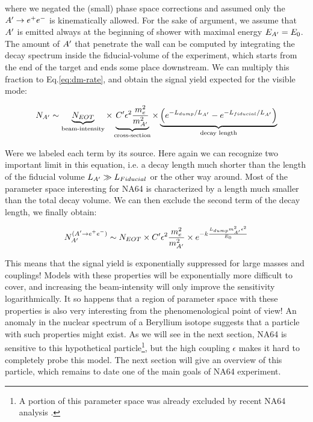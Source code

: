 where we negated the (small) phase space corrections and assumed only the $A' \to e^+e^-$ is kinematically allowed. For the sake of argument, we assume that $A'$ is emitted always at the beginning of shower with maximal energy $E_{A'} = E_0$. The amount of $A'$ that penetrate the wall can be computed by integrating the decay spectrum inside the fiducial-volume of the experiment, which starts from the end of the target and ends some place downstream. We can multiply this fraction to Eq.\ref{eq:dm-rate}, and obtain the signal yield expected for the visible mode:

\begin{equation}
  \label{eq:dm-rate-vis}
    N_{A'} \sim \underbrace{N_{EOT}}_{\textrm{beam-intensity}} \times \underbrace{C' \epsilon^2 \frac{m_e^2}{m^2_{A'}}}_{\textrm{cross-section}} \times \underbrace{\left(e^{- L_{dump}/L_{A'}} - e^{-L_{fiducial}/L_{A'}}\right)}_{\textrm{decay length}}
  \end{equation}

  Were we labeled each term by its source. Here again we can recognize two important limit in this equation, i.e. a decay length much shorter than the length of the fiducial volume $L_{A'} \gg L_{Fiducial}$ or the other way around. Most of the parameter space interesting for NA64 is characterized by a length much smaller than the total decay volume. We can then exclude the second term of the decay length, we finally obtain:

  \begin{equation}
    \label{eq:dm-rate-vis-limit}
    N_{A'}^{(A' \to e^+e^-)} \sim N_{EOT} \times C' \epsilon^2 \frac{m_e^2}{m^2_{A'}} \times e^{-k\frac{L_{dump} m^2_{A'}\epsilon^2}{E_0}}
  \end{equation}

  This means that the signal yield is exponentially suppressed for large masses and couplings! Models with these properties will be exponentially more difficult to cover, and increasing the beam-intensity will only improve the sensitivity logarithmically. It so happens that a region of parameter space with these properties is also very interesting from the phenomenological point of view! An anomaly in the nuclear spectrum of a Beryllium isotope suggests that a particle with such properties might exist. As we will see in the next section, NA64 is sensitive to this hypothetical particle\footnote{A portion of this parameter space was already excluded by recent NA64 analysis \cite{Banerjee:2019hmi,Banerjee:2018vgk}.}, but the high coupling $\epsilon$ makes it hard to completely probe this model. The next section will give an overview of this particle, which remains to date one of the main goals of NA64 experiment.

